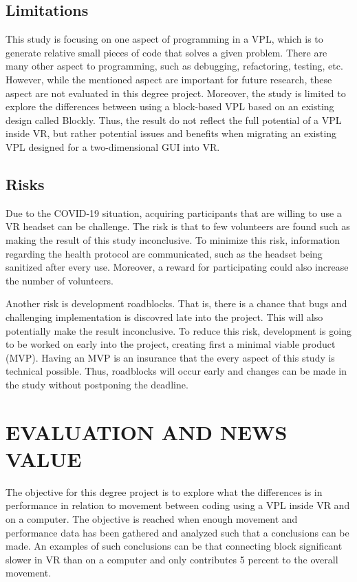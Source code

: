 \documentclass{sigchi}
\begin{document}
\subsection{Limitations}
This study is focusing on one aspect of programming in a VPL, which is to generate relative small pieces of code that solves a given problem. There are many other aspect to programming, such as debugging, refactoring, testing, etc. However, while the mentioned aspect are important for future research, these aspect are not evaluated in this degree project. Moreover, the study is limited to explore the differences between using a block-based VPL based on an existing design called Blockly. Thus, the result do not reflect the full potential of a VPL inside VR, but rather potential issues and benefits when migrating an existing VPL designed for a two-dimensional GUI into VR.

\subsection{Risks}
Due to the COVID-19 situation, acquiring participants that are willing to use a VR headset can be challenge. The risk is that to few volunteers are found such as making the result of this study inconclusive. To minimize this risk, information regarding the health protocol are communicated, such as the headset being sanitized after every use. Moreover, a reward for participating could also increase the number of volunteers. 

Another risk is development roadblocks. That is, there is a chance that bugs and challenging implementation is discovred late into the project. This will also potentially make the result inconclusive. To reduce this risk, development is going to be worked on early into the project, creating first a minimal viable product (MVP). Having an MVP is an insurance that the every aspect of this study is technical possible. Thus, roadblocks will occur early and changes can be made in the study without postponing the deadline.

\section{EVALUATION AND NEWS VALUE}
The objective for this degree project is to explore what the differences is in performance in relation to movement between coding using a VPL inside VR and on a computer. The objective is reached when enough movement and performance data has been gathered and analyzed such that a conclusions can be made. An examples of such conclusions can be that connecting block significant slower in VR than on a computer and only contributes 5 percent to the overall movement.
\end{document}
